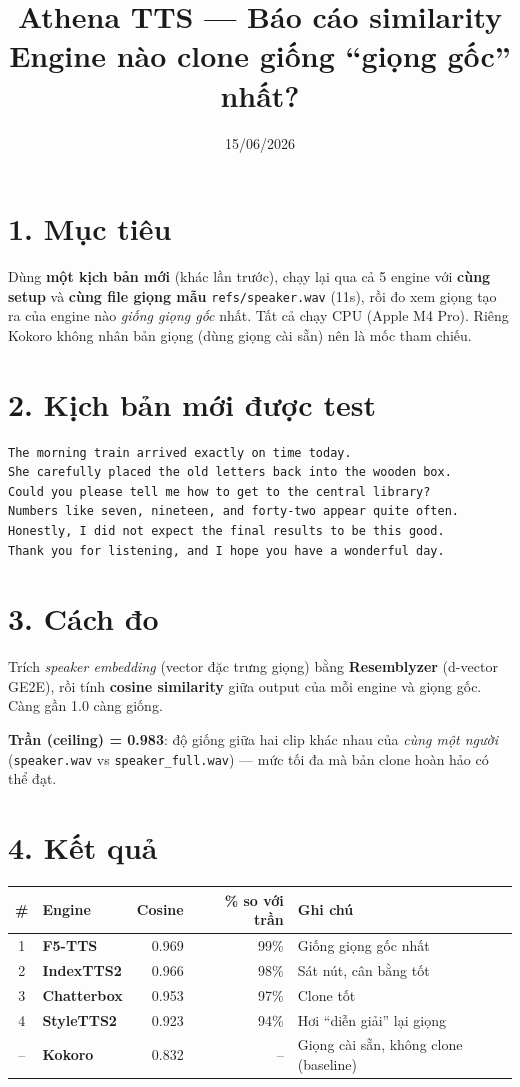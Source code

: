 \documentclass[11pt]{article}
\title{\textbf{Athena TTS — Báo cáo similarity}\\[2pt]
\large Engine nào clone giống ``giọng gốc'' nhất?}
\author{}
\date{15/06/2026}
\begin{document}
\maketitle
\vspace{-1.5em}

\section*{1. Mục tiêu}
Dùng \textbf{một kịch bản mới} (khác lần trước), chạy lại qua cả 5 engine với
\textbf{cùng setup} và \textbf{cùng file giọng mẫu} \texttt{refs/speaker.wav} (11s),
rồi đo xem giọng tạo ra của engine nào \textit{giống giọng gốc} nhất. Tất cả chạy CPU
(Apple M4 Pro). Riêng Kokoro không nhân bản giọng (dùng giọng cài sẵn) nên là mốc tham chiếu.

\section*{2. Kịch bản mới được test}
\begin{Verbatim}[frame=single,fontsize=\small,rulecolor=\color{gray}]
The morning train arrived exactly on time today.
She carefully placed the old letters back into the wooden box.
Could you please tell me how to get to the central library?
Numbers like seven, nineteen, and forty-two appear quite often.
Honestly, I did not expect the final results to be this good.
Thank you for listening, and I hope you have a wonderful day.
\end{Verbatim}

\section*{3. Cách đo}
Trích \textit{speaker embedding} (vector đặc trưng giọng) bằng \textbf{Resemblyzer}
(d-vector GE2E), rồi tính \textbf{cosine similarity} giữa output của mỗi engine và
giọng gốc. Càng gần 1.0 càng giống. \par
\textbf{Trần (ceiling) = 0.983}: độ giống giữa hai clip khác nhau của \emph{cùng một người}
(\texttt{speaker.wav} vs \texttt{speaker\_full.wav}) — mức tối đa mà bản clone hoàn hảo có thể đạt.

\section*{4. Kết quả}
\begin{table}[H]\centering
\begin{tabular}{c >{\bfseries}l r r l}
\toprule
\# & Engine & Cosine & \% so với trần & Ghi chú \\
\midrule
1 & F5-TTS     & 0.969 & 99\% & Giống giọng gốc nhất \\
2 & IndexTTS2  & 0.966 & 98\% & Sát nút, cân bằng tốt \\
3 & Chatterbox & 0.953 & 97\% & Clone tốt \\
4 & StyleTTS2  & 0.923 & 94\% & Hơi ``diễn giải'' lại giọng \\
\midrule
-- & Kokoro    & 0.832 & --   & Giọng cài sẵn, không clone (baseline) \\
\bottomrule
\end{tabular}
\end{table}
\end{document}
